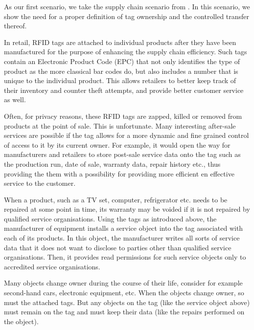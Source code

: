 As our first scenario, we take the supply chain scenario from
\cite{engberg2004zeroknowledge-rfid}. In this scenario, we show the need for a
proper definition of tag ownership and the controlled transfer thereof.

In retail, RFID tags are attached to individual
products after they have been manufactured for the purpose of enhancing the
supply chain efficiency. Such tags contain an Electronic Product
Code (EPC) that not only identifies the type of product as the more classical
bar codes do, but also includes a number that is unique to the individual
product. This allows retailers to better keep track of their inventory and
counter theft attempts, and provide better customer service as well.

Often, for privacy reasons, these RFID tags are zapped, killed or removed from
products at the point of sale. This is unfortunate. 
Many interesting after-sale services are possible if the tag allows for a more dynamic and
fine grained control of access to it by its current owner.
For example, it would open the way for manufacturers and
retailers to store post-sale service data onto the tag such as the production
run, date of sale, warranty data, repair history etc., thus providing the them
with a possibility for providing more efficient en effective service to the
customer. 

When a product, such as a TV set, computer, refrigerator etc. 
needs to be repaired at some point in time, its warranty may be voided if it is
not repaired by qualified service
organisations.
Using the tags as introduced above, the manufacturer of 
equipment installs a service object into the tag associated with each of its
products. In this object, the manufacturer writes all sorts of service data
that it does not want to disclose to parties other than qualified service
organisations. Then, it provides read permissions for such service objects 
only to accredited service organisations.

Many objects change owner during the course of their life, consider for example
second-hand cars, electronic equipment, etc. When the objects change owner, so
must the attached tags. But any objects on the tag (like the service object
above) must remain on the tag and must keep their data (like the repairs
performed on the object).

